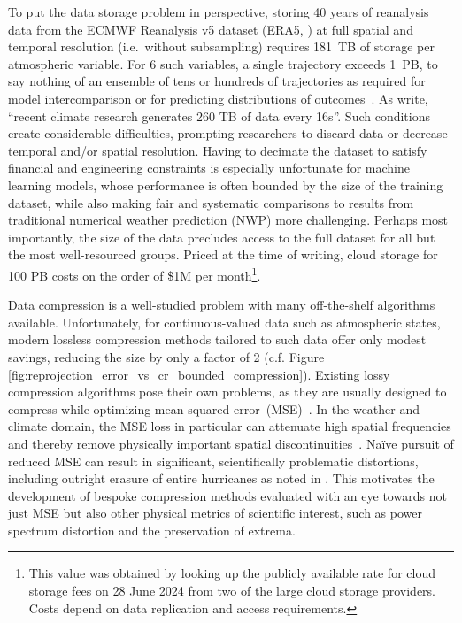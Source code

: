 \documentclass[11pt, a4paper, logo, copyright, numbering]{googledeepmind}
\begin{document}
To put the data storage problem in perspective, storing 40 years of reanalysis data from the ECMWF Reanalysis v5 dataset (ERA5, \citet{hersbach2020era5}) at full spatial and temporal resolution (i.e.\ without subsampling)
requires 181~TB of storage per atmospheric variable.
For 6 such variables, a single trajectory exceeds 1~PB, to say nothing of an ensemble of tens or hundreds of trajectories as required for model intercomparison or for predicting distributions of outcomes~\citep{eyring2016overview}. As \citet{sz3_framework} write, ``recent climate research generates 260 TB of data every 16s''. Such conditions create considerable difficulties, prompting researchers to discard data or decrease temporal and/or spatial resolution. 
Having to decimate the dataset to satisfy financial and engineering constraints is especially unfortunate for machine learning models, whose performance is often bounded by the size of the training dataset,
while also making fair and systematic comparisons to results from traditional numerical weather prediction (NWP) more challenging.
Perhaps most importantly, the size of the data precludes access to the full dataset for all but the most well-resourced groups. Priced at the time of writing, cloud storage for 100 PB costs on the order of \$1M per month\footnote{This value was obtained by looking up the publicly available rate for cloud storage fees on 28 June 2024 from two of the large cloud storage providers. Costs depend on data replication and access requirements.}.

Data compression is a well-studied problem with many off-the-shelf algorithms available. Unfortunately, for continuous-valued data such as atmospheric states, modern lossless compression methods tailored to such data offer only modest savings, reducing the size by only a factor of 2  (c.f. Figure \ref{fig:reprojection_error_vs_cr_bounded_compression}). Existing lossy compression algorithms pose their own problems, as they are usually designed to compress while optimizing mean squared error~(MSE)~\citep{sz3_algo}.
In the weather and climate domain, the MSE loss in particular can attenuate high spatial frequencies and thereby remove physically important spatial discontinuities~\citep{ravuri2021nowcasting}. Na\"ive pursuit of reduced MSE can result in significant, scientifically problematic distortions, including outright erasure of entire hurricanes as noted in \cite{huang2022compressing}. This motivates the development of bespoke compression methods evaluated with an eye towards not just MSE but also other physical metrics of scientific interest, such as power spectrum distortion and the preservation of extrema.
\end{document}
